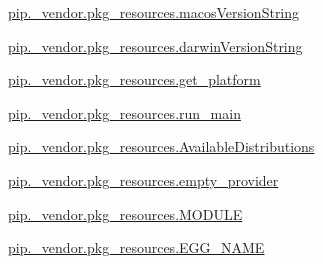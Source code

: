 \begin{DoxyCompactItemize}
\item 
\hyperlink{namespacepip_1_1__vendor_1_1pkg__resources_a87b88a69fe2b37d858299a61fb5b150d}{pip.\+\_\+vendor.\+pkg\+\_\+resources.\+macos\+Version\+String}
\item 
\hyperlink{namespacepip_1_1__vendor_1_1pkg__resources_a2679c716f4266a98c7bb6ea81e782d1d}{pip.\+\_\+vendor.\+pkg\+\_\+resources.\+darwin\+Version\+String}
\item 
\hyperlink{namespacepip_1_1__vendor_1_1pkg__resources_a852a694e03c10a8de66499c812a85ef6}{pip.\+\_\+vendor.\+pkg\+\_\+resources.\+get\+\_\+platform}
\item 
\hyperlink{namespacepip_1_1__vendor_1_1pkg__resources_aa3f82e27b12ba89be97b55081f0d6278}{pip.\+\_\+vendor.\+pkg\+\_\+resources.\+run\+\_\+main}
\item 
\hyperlink{namespacepip_1_1__vendor_1_1pkg__resources_aabf4f2174d1190e1862259a9b33f22f8}{pip.\+\_\+vendor.\+pkg\+\_\+resources.\+Available\+Distributions}
\item 
\hyperlink{namespacepip_1_1__vendor_1_1pkg__resources_a4b91a1707a16f42bc0be61e6f30468a4}{pip.\+\_\+vendor.\+pkg\+\_\+resources.\+empty\+\_\+provider}
\item 
\hyperlink{namespacepip_1_1__vendor_1_1pkg__resources_a358d53622f50cf8ba137427d2f0bd56f}{pip.\+\_\+vendor.\+pkg\+\_\+resources.\+M\+O\+D\+U\+LE}
\item 
\hyperlink{namespacepip_1_1__vendor_1_1pkg__resources_a7580ff9e7e31171c5a3b38c9c59d10c6}{pip.\+\_\+vendor.\+pkg\+\_\+resources.\+E\+G\+G\+\_\+\+N\+A\+ME}
\end{DoxyCompactItemize}
